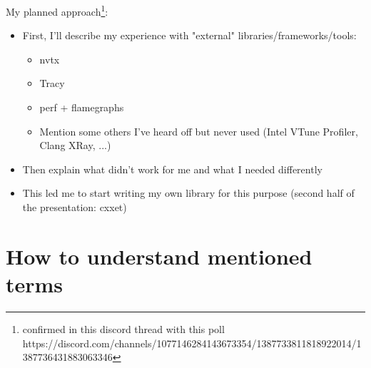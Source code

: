 \documentclass[aspectratio=169]{beamer}
\begin{document}
\begin{frame}
    My planned approach\footnote{confirmed in this discord thread with this poll https://discord.com/channels/1077146284143673354/1387733811818922014/1387736431883063346}:

    \begin{itemize}
        \item First, I'll describe my experience with "external" libraries/frameworks/tools:
        \begin{itemize}
            \item nvtx
            \item Tracy
            \item perf + flamegraphs
            \item Mention some others I've heard off but never used (Intel VTune Profiler, Clang XRay, ...)
        \end{itemize}
        \item Then explain what didn't work for me and what I needed differently
        \item This led me to start writing my own library for this purpose (second half of the presentation: cxxet)
    \end{itemize}

\end{frame}



\section{How to understand mentioned terms}
\end{document}
